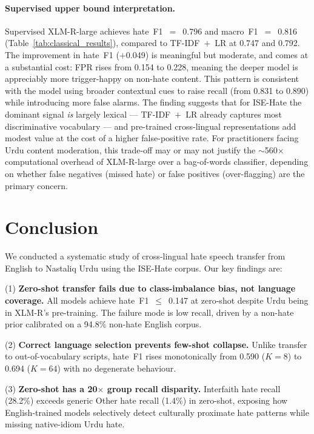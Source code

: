 \documentclass{article}
\begin{document}
\paragraph{Supervised upper bound interpretation.}
Supervised XLM-R-large achieves hate~F1~$=$~0.796 and macro~F1~$=$~0.816
(Table~\ref{tab:classical_results}), compared to TF-IDF~$+$~LR at 0.747 and 0.792.
The improvement in hate~F1 ($+$0.049) is meaningful but moderate,
and comes at a substantial cost: FPR rises from 0.154 to 0.228,
meaning the deeper model is appreciably more trigger-happy on non-hate content.
This pattern is consistent with the model using broader contextual cues
to raise recall (from 0.831 to 0.890) while introducing more false alarms.
The finding suggests that for ISE-Hate the dominant signal \emph{is} largely
lexical --- TF-IDF~$+$~LR already captures most discriminative vocabulary ---
and pre-trained cross-lingual representations add modest value at the cost
of a higher false-positive rate.
For practitioners facing Urdu content moderation, this trade-off may or may
not justify the $\sim$560$\times$ computational overhead of XLM-R-large
over a bag-of-words classifier, depending on whether false negatives
(missed hate) or false positives (over-flagging) are the primary concern.

\section{Conclusion}
\label{sec:conclusion}

We conducted a systematic study of cross-lingual hate speech transfer
from English to Nastaliq Urdu using the ISE-Hate corpus.
Our key findings are:

\noindent(1) \textbf{Zero-shot transfer fails due to class-imbalance bias,
not language coverage.}
All models achieve hate~F1~$\leq$~0.147 at zero-shot despite Urdu
being in XLM-R's pre-training.
The failure mode is low recall, driven by a non-hate prior calibrated
on a 94.8\% non-hate English corpus.

\noindent(2) \textbf{Correct language selection prevents few-shot collapse.}
Unlike transfer to out-of-vocabulary scripts, hate~F1 rises monotonically
from 0.590 ($K=8$) to 0.694 ($K=64$) with no degenerate behaviour.

\noindent(3) \textbf{Zero-shot has a 20$\times$ group recall disparity.}
Interfaith hate recall (28.2\%) exceeds generic Other hate recall (1.4\%)
in zero-shot, exposing how English-trained models selectively detect
culturally proximate hate patterns while missing native-idiom Urdu hate.
\end{document}
